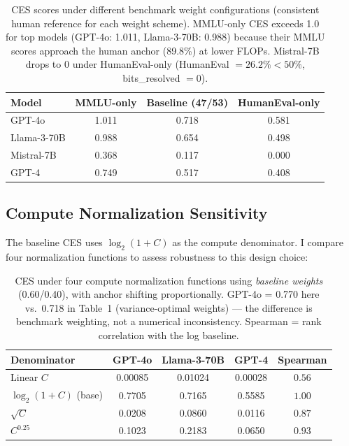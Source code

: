 \documentclass[12pt]{article}
\begin{document}
\begin{table}[H]
\centering
\begin{tabular}{lccc}
\toprule
\textbf{Model} & \textbf{MMLU-only} & \textbf{Baseline (47/53)} & \textbf{HumanEval-only} \\
\midrule
GPT-4o      & 1.011 & 0.718 & 0.581 \\
Llama-3-70B & 0.988 & 0.654 & 0.498 \\
Mistral-7B  & 0.368 & 0.117 & 0.000 \\
GPT-4       & 0.749 & 0.517 & 0.408 \\
\bottomrule
\end{tabular}
\caption{CES scores under different benchmark weight configurations (consistent human reference for each weight scheme). MMLU-only CES exceeds 1.0 for top models (GPT-4o: 1.011, Llama-3-70B: 0.988) because their MMLU scores approach the human anchor (89.8\%) at lower FLOPs. Mistral-7B drops to 0 under HumanEval-only (HumanEval $= 26.2\% < 50\%$, bits\_resolved $= 0$).}
\end{table}

\subsection{Compute Normalization Sensitivity}
\label{sec:compute-norm}

The baseline CES uses $\log_2(1+C)$ as the compute denominator. I compare four normalization functions to assess robustness to this design choice:

\begin{table}[H]
\centering
\small
\begin{tabular}{lcccc}
\toprule
\textbf{Denominator} & \textbf{GPT-4o} & \textbf{Llama-3-70B} & \textbf{GPT-4} & \textbf{Spearman} \\
\midrule
Linear $C$           & 0.00085 & 0.01024 & 0.00028 & $0.56$ \\
$\log_2(1+C)$ (base) & 0.7705  & 0.7165  & 0.5585  & $1.00$ \\
$\sqrt{C}$           & 0.0208  & 0.0860  & 0.0116  & $0.87$ \\
$C^{0.25}$           & 0.1023  & 0.2183  & 0.0650  & $0.93$ \\
\bottomrule
\end{tabular}
\caption{CES under four compute normalization functions using \textit{baseline weights} (0.60/0.40), with anchor shifting proportionally. GPT-4o = 0.770 here vs.\ 0.718 in Table~1 (variance-optimal weights) --- the difference is benchmark weighting, not a numerical inconsistency. Spearman = rank correlation with the log baseline.}
\end{table}
\end{document}
